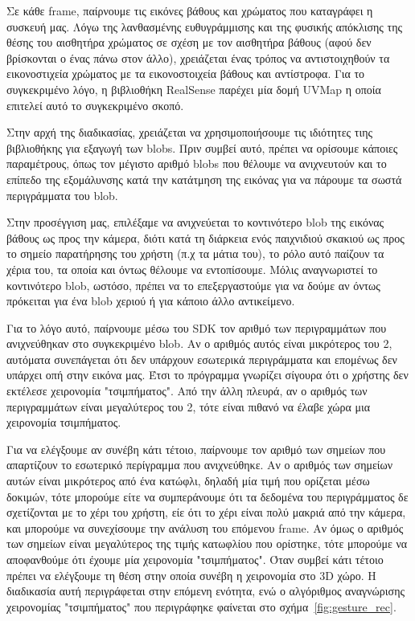 Σε κάθε frame, παίρνουμε τις εικόνες βάθους και χρώματος που καταγράφει η συσκευή μας. Λόγω της λανθασμένης ευθυγράμμισης και της φυσικής απόκλισης της θέσης του αισθητήρα χρώματος σε σχέση με τον αισθητήρα βάθους (αφού δεν βρίσκονται ο ένας πάνω στον άλλο), χρειάζεται ένας τρόπος να αντιστοιχηθούν τα εικονοστιχεία χρώματος με τα εικονοστοιχεία βάθους και αντίστροφα. Για το συγκεκριμένο λόγο, η βιβλιοθήκη RealSense παρέχει μία δομή UVMap η οποία επιτελεί αυτό το συγκεκριμένο σκοπό.

Στην αρχή της διαδικασίας, χρειάζεται να χρησιμοποιήσουμε τις ιδιότητες τιης βιβλιοθήκης για εξαγωγή των blobs. Πριν συμβεί αυτό, πρέπει να ορίσουμε κάποιες παραμέτρους, όπως τον μέγιστο αριθμό blobs που θέλουμε να ανιχνευτούν και το επίπεδο της εξομάλυνσης κατά την κατάτμηση της εικόνας για να πάρουμε τα σωστά περιγράμματα του blob. 

Στην προσέγγιση μας, επιλέξαμε να ανιχνεύεται το κοντινότερο blob της εικόνας βάθους ως προς την κάμερα, διότι κατά τη διάρκεια ενός παιχνιδιού σκακιού ως προς το σημείο παρατήρησης του χρήστη (π.χ τα μάτια του), το ρόλο αυτό παίζουν τα χέρια του, τα οποία και όντως θέλουμε να εντοπίσουμε. Μόλις αναγνωριστεί το κοντινότερο blob, ωστόσο, πρέπει να το επεξεργαστούμε για να δούμε αν όντως πρόκειται για ένα blob χεριού ή για κάποιο άλλο αντικείμενο.


Για το λόγο αυτό, παίρνουμε μέσω του SDK τον αριθμό των περιγραμμάτων που ανιχνεύθηκαν στο συγκεκριμένο blob. Αν ο αριθμός αυτός είναι μικρότερος του 2, αυτόματα συνεπάγεται ότι δεν υπάρχουν εσωτερικά περιγράμματα και επομένως δεν υπάρχει οπή στην εικόνα μας. Έτσι το πρόγραμμα γνωρίζει σίγουρα ότι ο χρήστης δεν εκτέλεσε χειρονομία "τσιμπήματος". Από την άλλη πλευρά, αν ο αριθμός των περιγραμμάτων είναι μεγαλύτερος του 2, τότε είναι πιθανό να έλαβε χώρα μια χειρονομία τσιμπήματος. 


Για να ελέγξουμε αν συνέβη κάτι τέτοιο, παίρνουμε τον αριθμό των σημείων που απαρτίζουν το εσωτερικό περίγραμμα που ανιχνεύθηκε. Αν ο αριθμός των σημείων αυτών είναι μικρότερος από ένα κατώφλι, δηλαδή μία τιμή που ορίζεται μέσω δοκιμών, τότε μπορούμε είτε να συμπεράνουμε ότι τα δεδομένα του περιγράμματος δε σχετίζονται με το χέρι του χρήστη, είε ότι το χέρι είναι πολύ μακριά από την κάμερα, και μπορούμε να συνεχίσουμε την ανάλυση του επόμενου frame. Αν όμως ο αριθμός των σημείων είναι μεγαλύτερος της τιμής κατωφλίου που ορίστηκε, τότε μπορούμε να αποφανθούμε ότι έχουμε μία χειρονομία "τσιμπήματος". Όταν συμβεί κάτι τέτοιο πρέπει να ελέγξουμε τη θέση στην οποία συνέβη η χειρονομία στο 3D χώρο. Η διαδικασία αυτή περιγράφεται στην επόμενη ενότητα, ενώ ο αλγόριθμος αναγνώρισης χειρονομίας "τσιμπήματος" που περιγράφηκε φαίνεται στο σχήμα~\ref{fig:gesture_rec}.



